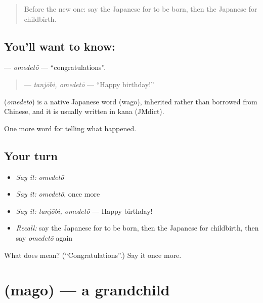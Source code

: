 \label{lesson:JA-C286-omedetou}



\begin{quote}
Before the new one: say the Japanese for to be born, then the Japanese for childbirth.
\end{quote}

\subsection*{You'll want to know: }
\textbf{} — \emph{omedetō} — \textquotedblleft{}congratulations\textquotedblright{}.

\begin{quote}
\textbf{} — \emph{tanjōbi, omedetō} — \textquotedblleft{}Happy birthday!\textquotedblright{}
\end{quote}

\begin{cousinweb}
\textbf{} (\emph{omedetō}) is a native Japanese word (wago), inherited rather than borrowed from Chinese, and it is usually written in kana (JMdict).
\end{cousinweb}

\begin{grammarlens}[title={What you've built}]
One more word for telling what happened.
\end{grammarlens}

\subsection*{Your turn}
\begin{itemize}
\raggedright
  \item \emph{Say it:} \emph{omedetō}
  \item \emph{Say it:} \emph{omedetō}, once more
  \item \emph{Say it:} \emph{tanjōbi, omedetō} — Happy birthday!
  \item \emph{Recall:} say the Japanese for to be born, then the Japanese for childbirth, then say \emph{omedetō} again
\end{itemize}

\begin{tcolorbox}[breakable,colback=teal!4,colframe=teal!35!black,title={Before you move on}]
What does  mean? (\textquotedblleft{}Congratulations\textquotedblright{}.) Say it once more.
\end{tcolorbox}
\section[\texorpdfstring{\ja{まご} (mago)}{まご (mago)}]{ (mago) — a grandchild}

